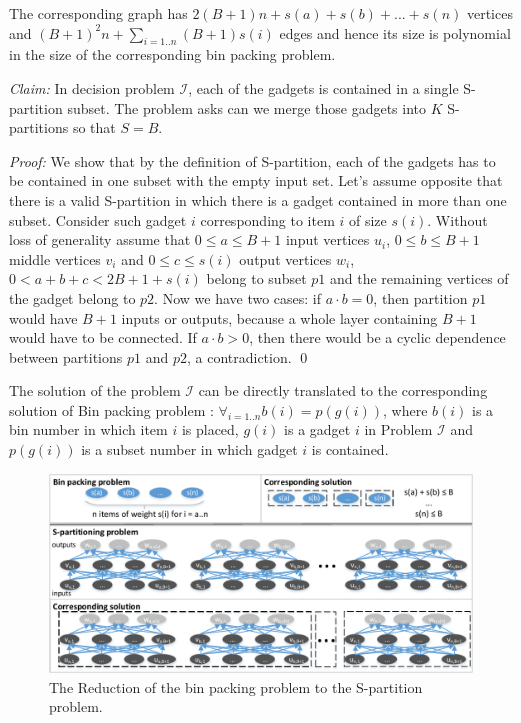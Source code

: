 \documentclass[sigconf]{acmart}
\begin{document}
The corresponding graph has $2(B+1)n + s(a)+s(b)+...+s(n)$ vertices and 
$(B+1)^2 n + \sum_{i = 1..n}(B+1)s(i)$ edges and hence its size is polynomial 
in the size 
of the corresponding bin packing problem.

\textit{Claim:}
In decision problem $\mathcal{I}$, each of the gadgets is contained in a single 
S-partition subset. 
The problem asks can we merge those gadgets into $K$ S-partitions so that $S = 
B$.

\textit{Proof: }
We show that by the definition of S-partition, each of the gadgets has to 
be contained in one subset with the empty input set. Let's assume 
opposite that there is a valid S-partition in which there is a gadget contained 
in more than one subset. Consider such gadget $i$ corresponding to item $i$ of 
size $s(i)$.
Without loss of generality assume that $0 \le a \le B+1$ input vertices 
$u_{i}$, $0 \le b \le B+1$ middle vertices $v_{i}$ and $0 \le c \le s(i)$ 
output 
vertices $w_{i}$, $0 < a + b + c < 2B + 1 + s(i)$ belong to subset $p1$ and the 
remaining vertices of the gadget belong to $p2$. Now we have two cases: if $a 
\cdot b = 
0$, then partition $p1$ would have $B+1$ inputs or outputs, because a whole 
layer containing $B+1$ would have to be connected. If $a \cdot b > 0$, then 
there would be a cyclic dependence between partitions $p1$ and $p2$, a 
contradiction. \qed

The solution of the problem $\mathcal{I}$ can be directly translated to the 
corresponding solution of Bin packing problem : $\forall_{i = 1..n} b(i) = 
p(g(i))$, where $b(i)$ is a bin number in which item $i$ is placed, $g(i)$ is a 
gadget $i$ in Problem $\mathcal{I}$ and $p(g(i))$ is a subset number in which 
gadget $i$ is contained.

\begin{figure}
	\includegraphics[width=\columnwidth]{figures/spartitioning_nphard3}
	\caption{The Reduction of the bin packing problem to the S-partition 
	problem.}
	\label{fig:spartition_binpacking}
\end{figure}
\end{document}
